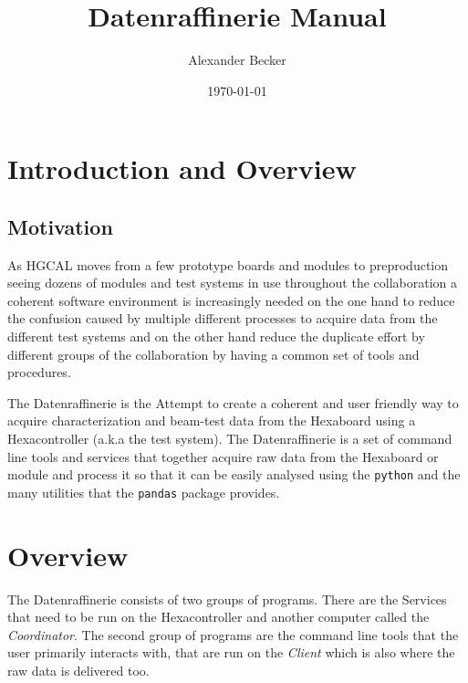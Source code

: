 \documentclass[11pt]{article}
\title{Datenraffinerie Manual}
\author{Alexander Becker}
\date{\today}
\begin{document}
\maketitle
\tableofcontents
\pagebreak
\section{Introduction and Overview}
\subsection{Motivation}
As HGCAL moves from a few prototype boards and modules to preproduction seeing dozens of modules and test systems in use throughout the collaboration a coherent software environment is increasingly needed on the one hand to reduce the confusion caused by multiple different processes to acquire data from the different test systems and on the other hand reduce the duplicate effort by different groups of the collaboration by having a common set of tools and procedures.

The Datenraffinerie is the Attempt to create a coherent and user friendly way to acquire characterization and beam-test data from the Hexaboard using a Hexacontroller (a.k.a the test system). The Datenraffinerie is a set of command line tools and services that together acquire raw data from the Hexaboard or module and process it so that it can be easily analysed using the \texttt{python} and the many utilities that the \texttt{pandas} package provides.

\section{Overview}
The Datenraffinerie consists of two groups of programs. There are the Services that need to be run on the Hexacontroller and another computer called the \emph{Coordinator}. The second group of programs are the command line tools that the user primarily interacts with, that are run on the \emph{Client} which is also where the raw data is delivered too.
\end{document}
